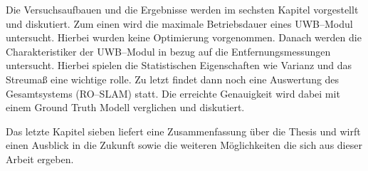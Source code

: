 Die Versuchsaufbauen und die Ergebnisse werden im sechsten Kapitel vorgestellt und diskutiert. Zum einen wird die maximale Betriebsdauer eines UWB--Modul untersucht. Hierbei wurden keine Optimierung vorgenommen. Danach werden die Charakteristiker der UWB--Modul in bezug auf die Entfernungsmessungen untersucht. Hierbei spielen die Statistischen Eigenschaften wie Varianz und das Streumaß eine wichtige rolle. Zu letzt findet dann noch eine Auswertung des Gesamtsystems (RO--SLAM) statt. Die erreichte Genauigkeit wird dabei mit einem Ground Truth Modell verglichen und diskutiert.

Das letzte Kapitel sieben liefert eine Zusammenfassung über die Thesis und wirft einen Ausblick in die Zukunft sowie die weiteren Möglichkeiten die sich aus dieser Arbeit ergeben.

